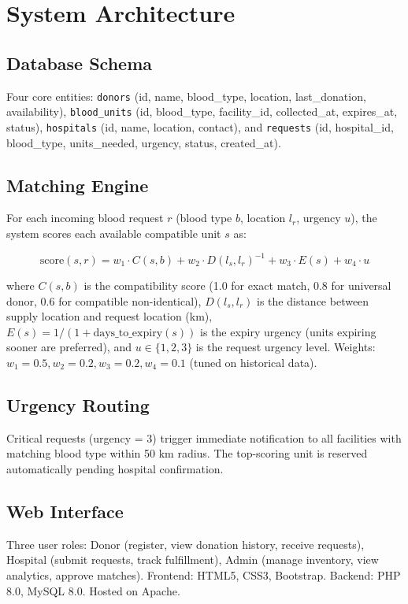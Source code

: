\documentclass[conference]{IEEEtran}
\begin{document}
\section{System Architecture}

\subsection{Database Schema}
Four core entities: \texttt{donors} (id, name, blood\_type, location, last\_donation, availability), \texttt{blood\_units} (id, blood\_type, facility\_id, collected\_at, expires\_at, status), \texttt{hospitals} (id, name, location, contact), and \texttt{requests} (id, hospital\_id, blood\_type, units\_needed, urgency, status, created\_at).

\subsection{Matching Engine}

For each incoming blood request $r$ (blood type $b$, location $l_r$, urgency $u$), the system scores each available compatible unit $s$ as:

\begin{equation}
\text{score}(s, r) = w_1 \cdot C(s, b) + w_2 \cdot D(l_s, l_r)^{-1} + w_3 \cdot E(s) + w_4 \cdot u
\end{equation}

where $C(s, b)$ is the compatibility score (1.0 for exact match, 0.8 for universal donor, 0.6 for compatible non-identical), $D(l_s, l_r)$ is the distance between supply location and request location (km), $E(s) = 1 / (1 + \text{days\_to\_expiry}(s))$ is the expiry urgency (units expiring sooner are preferred), and $u \in \{1, 2, 3\}$ is the request urgency level. Weights: $w_1 = 0.5, w_2 = 0.2, w_3 = 0.2, w_4 = 0.1$ (tuned on historical data).

\subsection{Urgency Routing}
Critical requests (urgency = 3) trigger immediate notification to all facilities with matching blood type within 50 km radius. The top-scoring unit is reserved automatically pending hospital confirmation.

\subsection{Web Interface}
Three user roles: Donor (register, view donation history, receive requests), Hospital (submit requests, track fulfillment), Admin (manage inventory, view analytics, approve matches). Frontend: HTML5, CSS3, Bootstrap. Backend: PHP 8.0, MySQL 8.0. Hosted on Apache.
\end{document}
